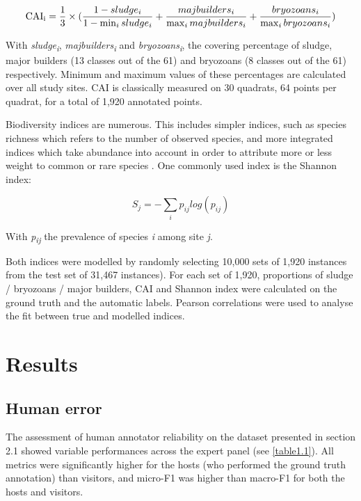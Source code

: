 \begin{equation}
\text{CAI\textsubscript{i}}=\frac{1}{3}\times(\frac{1-sludge_i}{1-\min_{i}sludge_i}+\frac{majbuilders_i}{\max_{i}majbuilders_i}+\frac{bryozoans_i}{\max_{i}bryozoans_i})
\label{eq1.7}
\end{equation}

With \textit{sludge\textsubscript{i}}, \textit{majbuilders\textsubscript{i}} and \textit{bryozoans\textsubscript{i}}, the covering percentage of sludge, major builders (13 classes out of the 61) and bryozoans (8 classes out of the 61) respectively. Minimum and maximum values of these percentages are calculated over all study sites. CAI is classically measured on 30 quadrats, 64 points per quadrat, for a total of 1,920 annotated points.

Biodiversity indices are numerous. This includes simpler indices, such as species richness which refers to the number of observed species, and more integrated indices which take abundance into account in order to attribute more or less weight to common or rare species \citep{magurran_measuring_2004}. One commonly used index is the Shannon index:

\begin{equation}
	S_j=-\sum_{i}p_{ij} log(p_{ij})
	\label{eq1.8}
\end{equation}

With \textit{p\textsubscript{ij}} the prevalence of species \textit{i} among site \textit{j}.

Both indices were modelled by randomly selecting 10,000 sets of 1,920 instances from the test set of 31,467 instances). For each set of 1,920, proportions of sludge / bryozoans / major builders, CAI and Shannon index were calculated on the ground truth and the automatic labels. Pearson correlations were used to analyse the fit between true and modelled indices.

\section{Results}\label{chapitre1_6}

\subsection{Human error}\label{chapitre1_6.1}
The assessment of human annotator reliability on the dataset presented in section 2.1 showed variable performances across the expert panel (see \autoref{table1.1}). All metrics were significantly higher for the hosts (who performed the ground truth annotation) than visitors, and micro-F1 was higher than macro-F1 for both the hosts and visitors.


